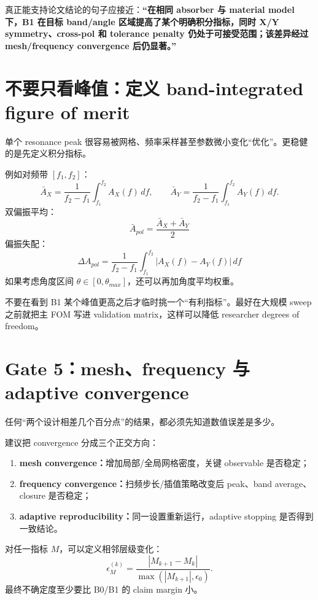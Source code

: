 \documentclass[11pt,a4paper,openany]{ctexrep}
\begin{document}
\begin{projectbox}
真正能支持论文结论的句子应接近：\textbf{“在相同 absorber 与 material model 下，B1 在目标 band/angle 区域提高了某个明确积分指标，同时 X/Y symmetry、cross-pol 和 tolerance penalty 仍处于可接受范围；该差异经过 mesh/frequency convergence 后仍显著。”}
\end{projectbox}

\section{不要只看峰值：定义 band-integrated figure of merit}

单个 resonance peak 很容易被网格、频率采样甚至参数微小变化“优化”。更稳健的是先定义积分指标。

例如对频带 $[f_1,f_2]$：
\[
\bar A_X=\frac{1}{f_2-f_1}\int_{f_1}^{f_2}A_X(f)\,df,
\qquad
\bar A_Y=\frac{1}{f_2-f_1}\int_{f_1}^{f_2}A_Y(f)\,df.
\]
双偏振平均：
\[
\boxed{
\bar A_{pol}=\frac{\bar A_X+\bar A_Y}{2}
}
\]
偏振失配：
\[
\boxed{
\Delta A_{pol}=\frac{1}{f_2-f_1}
\int_{f_1}^{f_2}|A_X(f)-A_Y(f)|\,df
}
\]
如果考虑角度区间 $\theta\in[0,\theta_{max}]$，还可以再加角度平均权重。

\begin{mistakebox}
不要在看到 B1 某个峰值更高之后才临时挑一个“有利指标”。最好在大规模 sweep 之前就把主 FOM 写进 validation matrix，这样可以降低 researcher degrees of freedom。
\end{mistakebox}

\section{Gate 5：mesh、frequency 与 adaptive convergence}

任何“两个设计相差几个百分点”的结果，都必须先知道数值误差是多少。

建议把 convergence 分成三个正交方向：
\begin{enumerate}
  \item \textbf{mesh convergence：}增加局部/全局网格密度，关键 observable 是否稳定；
  \item \textbf{frequency convergence：}扫频步长/插值策略改变后 peak、band average、closure 是否稳定；
  \item \textbf{adaptive reproducibility：}同一设置重新运行，adaptive stopping 是否得到一致结论。
\end{enumerate}

对任一指标 $M$，可以定义相邻层级变化：
\[
\epsilon_M^{(k)}=\frac{|M_{k+1}-M_k|}{\max(|M_{k+1}|,\epsilon_0)}.
\]
最终不确定度至少要比 B0/B1 的 claim margin 小。
\end{document}

